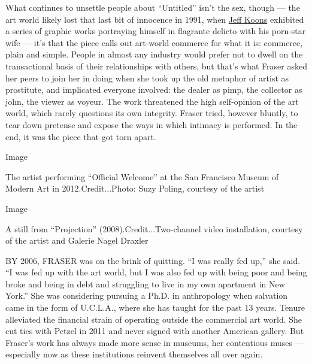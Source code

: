 What continues to unsettle people about ``Untitled'' isn't the sex,
though --- the art world likely lost that last bit of innocence in 1991,
when
\href{https://www.nytimes3xbfgragh.onion/2018/04/17/t-magazine/east-village-artist-jeff-koons-peter-halley.html}{Jeff
Koons} exhibited a series of graphic works portraying himself in
flagrante delicto with his porn-star wife --- it's that the piece calls
out art-world commerce for what it is: commerce, plain and simple.
People in almost any industry would prefer not to dwell on the
transactional basis of their relationships with others, but that's what
Fraser asked her peers to join her in doing when she took up the old
metaphor of artist as prostitute, and implicated everyone involved: the
dealer as pimp, the collector as john, the viewer as voyeur. The work
threatened the high self-opinion of the art world, which rarely
questions its own integrity. Fraser tried, however bluntly, to tear down
pretense and expose the ways in which intimacy is performed. In the end,
it was the piece that got torn apart.

Image

The artist performing ``Official Welcome'' at the San Francisco Museum
of Modern Art in 2012.Credit...Photo: Suzy Poling, courtesy of the
artist

Image

A still from ``Projection'' (2008).Credit...Two-channel video
installation, courtesy of the artist and Galerie Nagel Draxler

BY 2006, FRASER was on the brink of quitting. ``I was really fed up,''
she said. ``I was fed up with the art world, but I was also fed up with
being poor and being broke and being in debt and struggling to live in
my own apartment in New York.'' She was considering pursuing a Ph.D. in
anthropology when salvation came in the form of U.C.L.A., where she has
taught for the past 13 years. Tenure alleviated the financial strain of
operating outside the commercial art world. She cut ties with Petzel in
2011 and never signed with another American gallery. But Fraser's work
has always made more sense in museums, her contentious muses ---
especially now as these institutions reinvent themselves all over again.

